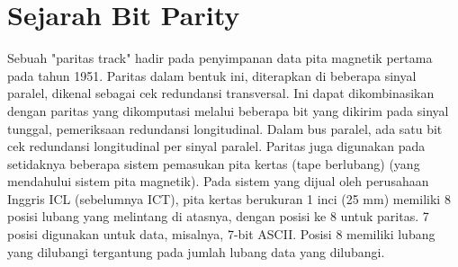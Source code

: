 
\section{Sejarah Bit Parity}
Sebuah "paritas track" hadir pada penyimpanan data pita magnetik pertama pada tahun 1951. Paritas dalam bentuk ini, diterapkan di beberapa sinyal paralel, dikenal sebagai cek redundansi transversal. Ini dapat dikombinasikan dengan paritas yang dikomputasi melalui beberapa bit yang dikirim pada sinyal tunggal, pemeriksaan redundansi longitudinal. Dalam bus paralel, ada satu bit cek redundansi longitudinal per sinyal paralel.
Paritas juga digunakan pada setidaknya beberapa sistem pemasukan pita kertas (tape berlubang) (yang mendahului sistem pita magnetik). Pada sistem yang dijual oleh perusahaan Inggris ICL (sebelumnya ICT), pita kertas berukuran 1 inci (25 mm) memiliki 8 posisi lubang yang melintang di atasnya, dengan posisi ke 8 untuk paritas. 7 posisi digunakan untuk data, misalnya, 7-bit ASCII. Posisi 8 memiliki lubang yang dilubangi tergantung pada jumlah lubang data yang dilubangi.